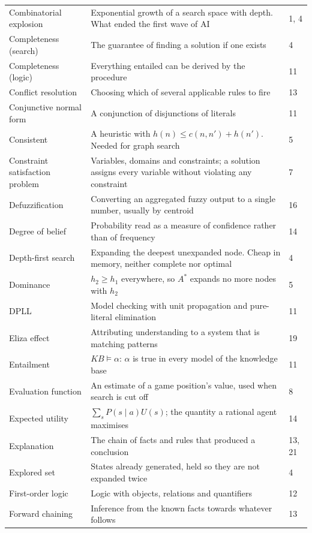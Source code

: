 \begin{longtable}{@{}L{3.6cm}L{10.2cm}L{1.0cm}@{}}
Combinatorial explosion & Exponential growth of a search space with depth. What
ended the first wave of AI & 1, 4 \\
Completeness (search) & The guarantee of finding a solution if one exists & 4 \\
Completeness (logic) & Everything entailed can be derived by the procedure & 11 \\
Conflict resolution & Choosing which of several applicable rules to fire & 13 \\
Conjunctive normal form & A conjunction of disjunctions of literals & 11 \\
Consistent & A heuristic with $h(n) \le c(n,n') + h(n')$. Needed for graph search
& 5 \\
Constraint satisfaction problem & Variables, domains and constraints; a solution
assigns every variable without violating any constraint & 7 \\
Defuzzification & Converting an aggregated fuzzy output to a single number,
usually by centroid & 16 \\
Degree of belief & Probability read as a measure of confidence rather than of
frequency & 14 \\
Depth-first search & Expanding the deepest unexpanded node. Cheap in memory,
neither complete nor optimal & 4 \\
Dominance & $h_{2} \ge h_{1}$ everywhere, so $A^{*}$ expands no more nodes with
$h_{2}$ & 5 \\
DPLL & Model checking with unit propagation and pure-literal elimination & 11 \\
Eliza effect & Attributing understanding to a system that is matching patterns &
19 \\
Entailment & $\mathit{KB} \models \alpha$: $\alpha$ is true in every model of the
knowledge base & 11 \\
Evaluation function & An estimate of a game position's value, used when search is
cut off & 8 \\
Expected utility & $\sum_{s} P(s \mid a) U(s)$; the quantity a rational agent
maximises & 14 \\
Explanation & The chain of facts and rules that produced a conclusion & 13, 21 \\
Explored set & States already generated, held so they are not expanded twice &
4 \\
First-order logic & Logic with objects, relations and quantifiers & 12 \\
Forward chaining & Inference from the known facts towards whatever follows & 13 \\

\end{longtable}
